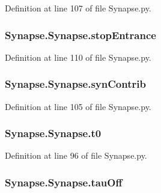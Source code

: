 Definition at line 107 of file Synapse.\-py.

\hypertarget{class_synapse_1_1_synapse_aac4c50cca15e42396f1bfff761693696}{
\subsubsection[{stop\-Entrance}]{\setlength{\rightskip}{0pt plus 5cm}Synapse.\-Synapse.\-stop\-Entrance}}\label{class_synapse_1_1_synapse_aac4c50cca15e42396f1bfff761693696}


Definition at line 110 of file Synapse.\-py.

\hypertarget{class_synapse_1_1_synapse_ac9fc1da99a88f8dd286d3ff3ce484b85}{
\subsubsection[{syn\-Contrib}]{\setlength{\rightskip}{0pt plus 5cm}Synapse.\-Synapse.\-syn\-Contrib}}\label{class_synapse_1_1_synapse_ac9fc1da99a88f8dd286d3ff3ce484b85}


Definition at line 105 of file Synapse.\-py.

\hypertarget{class_synapse_1_1_synapse_ad0adf1cb832bd7ce7918f2779171d7d7}{
\subsubsection[{t0}]{\setlength{\rightskip}{0pt plus 5cm}Synapse.\-Synapse.\-t0}}\label{class_synapse_1_1_synapse_ad0adf1cb832bd7ce7918f2779171d7d7}


Definition at line 96 of file Synapse.\-py.

\hypertarget{class_synapse_1_1_synapse_afd5638a223c3fdcc672002dbced7bed0}{
\subsubsection[{tau\-Off}]{\setlength{\rightskip}{0pt plus 5cm}Synapse.\-Synapse.\-tau\-Off}}\label{class_synapse_1_1_synapse_afd5638a223c3fdcc672002dbced7bed0}


